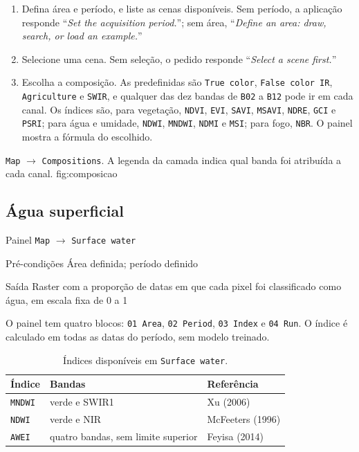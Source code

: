 \documentclass[12pt,a4paper]{article}
\newcommand{\msg}[1]{``\textit{#1}''}
\begin{document}
\begin{enumerate}[leftmargin=*,itemsep=.25em]
  \item Defina \'area e per\'iodo, e liste as cenas dispon\'iveis. Sem
        per\'iodo, a aplica\c{c}\~ao responde \msg{Set the acquisition
        period.}; sem \'area, \msg{Define an area: draw, search, or load an
        example.}
  \item Selecione uma cena. Sem sele\c{c}\~ao, o pedido responde
        \msg{Select a scene first.}
  \item Escolha a composi\c{c}\~ao. As predefinidas s\~ao \texttt{True color},
        \texttt{False color IR}, \texttt{Agriculture} e \texttt{SWIR}, e
        qualquer das dez bandas de \texttt{B02} a \texttt{B12} pode ir em cada
        canal. Os \'indices s\~ao, para vegeta\c{c}\~ao, \texttt{NDVI},
        \texttt{EVI}, \texttt{SAVI}, \texttt{MSAVI}, \texttt{NDRE},
        \texttt{GCI} e \texttt{PSRI}; para \'agua e umidade, \texttt{NDWI},
        \texttt{MNDWI}, \texttt{NDMI} e \texttt{MSI}; para fogo,
        \texttt{NBR}. O painel mostra a f\'ormula do escolhido.
\end{enumerate}

  {\texttt{Map} $\rightarrow$ \texttt{Compositions}. A legenda da camada indica
   qual banda foi atribu\'ida a cada canal.}
  {fig:composicao}

\subsection{\'Agua superficial}

\begin{ficha}
  \item[Painel] \texttt{Map} $\rightarrow$ \texttt{Surface water}
  \item[Pr\'e-condi\c{c}\~oes] \'Area definida; per\'iodo definido
  \item[Sa\'ida] Raster com a propor\c{c}\~ao de datas em que cada pixel foi
        classificado como \'agua, em escala fixa de 0 a 1
\end{ficha}

O painel tem quatro blocos: \texttt{01 Area}, \texttt{02 Period},
\texttt{03 Index} e \texttt{04 Run}. O \'indice \'e calculado em todas as datas
do per\'iodo, sem modelo treinado.

\begin{table}[htbp]\centering
\caption{\'Indices dispon\'iveis em \texttt{Surface water}.}
\label{tab:agua}
\small
\renewcommand{\arraystretch}{1.18}
\begin{tabular}{@{}L{2.2cm}L{5.4cm}L{7.7cm}@{}}
\toprule
\textbf{\'Indice} & \textbf{Bandas} & \textbf{Refer\^encia} \\
\midrule
\texttt{MNDWI} & verde e SWIR1 & Xu (2006) \\
\texttt{NDWI}  & verde e NIR & McFeeters (1996) \\
\texttt{AWEI}  & quatro bandas, sem limite superior & Feyisa (2014) \\
\bottomrule
\end{tabular}
\end{table}
\end{document}
